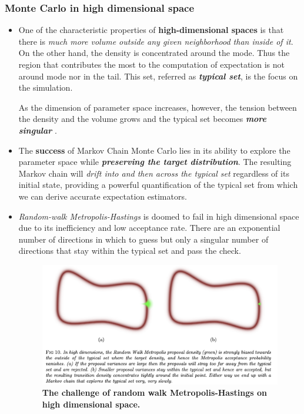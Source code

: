 \documentclass[11pt]{article}
\begin{document}
\subsubsection{Monte Carlo in high dimensional space}
\begin{itemize}
\item One of the characteristic properties of \textbf{high-dimensional spaces} is that there is \emph{much more volume outside any given neighborhood than inside of it}. On the other hand, the density is concentrated around the mode. Thus the region that contributes the most to the computation of expectation is not around mode nor in the tail. This set, referred as \emph{\textbf{typical set}}, is the focus on the simulation. 

As the dimension of parameter space increases, however,  the tension between the density and the volume grows and the typical set becomes \emph{\textbf{more singular}} \citep{betancourt2017conceptual}.

\item The \textbf{success} of Markov Chain Monte Carlo lies in its ability to explore the parameter space while \emph{\textbf{preserving the target distribution}}. The resulting Markov chain will \emph{drift into and then across the typical set} regardless of its initial state, providing a powerful quantification of the typical set from which we can derive accurate expectation estimators.

\item \emph{Random-walk Metropolis-Hastings} is doomed to fail in high dimensional space due to its inefficiency and low acceptance rate. There are an exponential number of directions in which to guess but only a singular number of directions that stay within the typical set and pass the check.

\begin{figure}
\begin{minipage}[t]{1\linewidth}
  \centering
  \centerline{\includegraphics[scale = 0.5]{random_walk_high_dim.png}}
\end{minipage}
\caption{\footnotesize{\textbf{The challenge of random walk Metropolis-Hastings on high dimensional space.  \citep{betancourt2017conceptual}}}}
\label{fig: random_walk_high_dim}
\end{figure}


\end{itemize}
\end{document}
